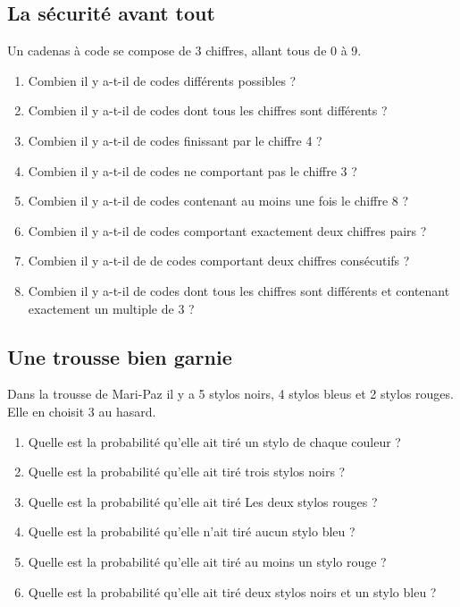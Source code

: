 \documentclass[oneside,12pt]{article}          %
\begin{document}
\subsection{La sécurité avant tout}
Un cadenas à code se compose de 3 chiffres, allant tous de 0 à 9.
\begin{enumerate}
    \item Combien il y a-t-il de codes différents possibles ?
    \item Combien il y a-t-il de codes dont tous les chiffres sont différents ?
    \item Combien il y a-t-il de codes finissant par le chiffre 4 ?
    \item Combien il y a-t-il de codes ne comportant pas le chiffre 3 ?
    \item Combien il y a-t-il de codes contenant au moins une fois le chiffre 8 ?
    \item Combien il y a-t-il de codes comportant exactement deux chiffres pairs ?
    \item Combien il y a-t-il de de codes comportant deux chiffres consécutifs ?
    \item Combien il y a-t-il de codes dont tous les chiffres sont différents et contenant exactement un multiple de 3 ?
\end{enumerate}



\subsection{Une trousse bien garnie}
Dans la trousse de Mari-Paz il y a 5 stylos noirs, 4 stylos bleus et 2 stylos rouges.\\
Elle en choisit 3 au hasard.
\begin{enumerate}
    \item Quelle est la probabilité qu'elle ait tiré un stylo de chaque couleur ?
    \item Quelle est la probabilité qu'elle ait tiré trois stylos noirs ?
    \item Quelle est la probabilité qu'elle ait tiré Les deux stylos rouges ?
    \item Quelle est la probabilité qu'elle n'ait tiré aucun stylo bleu ?
    \item Quelle est la probabilité qu'elle ait tiré au moins un stylo rouge ?
    \item Quelle est la probabilité qu'elle ait tiré deux stylos noirs et un stylo bleu ?
\end{enumerate}
\end{document}
